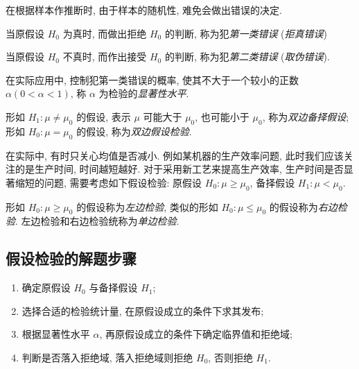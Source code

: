 在根据样本作推断时, 由于样本的随机性, 难免会做出错误的决定.

\begin{definition}[第一类错误]
    当原假设 $ H_{0} $ 为真时, 而做出拒绝 $ H_{0} $ 的判断, 称为犯\textit{第一类错误} (\textit{拒真错误})
\end{definition}

\begin{definition}[第二类错误]
    当原假设 $ H_{0} $ 不真时, 而作出接受 $ H_{0} $ 的判断, 称为犯\textit{第二类错误} (\textit{取伪错误}).
\end{definition}

\begin{definition}[显著性水平]
    在实际应用中, 控制犯第一类错误的概率, 使其不大于一个较小的正数 $ \alpha(0<\alpha<1)$, 称 $ \alpha $ 为检验的\textit{显著性水平}.
\end{definition}

\begin{definition}[双边备择假设与双边假设检验]
    形如 $ H_{1}: \mu \neq \mu_{0} $ 的假设, 表示 $ \mu $ 可能大于 $ \mu_{0} $, 也可能小于 $ \mu_{0}$, 称为\textit{双边备择假设};
    形如 $ H_{0}: \mu=\mu_{0} $ 的假设, 称为\textit{双边假设检验}.
\end{definition}

在实际中, 有时只关心均值是否减小. 例如某机器的生产效率问题, 此时我们应该关注的是生产时间, 时间越短越好.
对于采用新工艺来提高生产效率, 生产时间是否显著缩短的问题, 需要考虑如下假设检验:
原假设 $ H_{0}: \mu \geqslant \mu_{0}$, 备择假设 $ H_{1}: \mu<\mu_{0} .$

\begin{definition}[单边检验]
    形如 $ H_{0}: \mu \geqslant \mu_{0} $ 的假设称为\textit{左边检验}, 类似的形如 $ H_{0}: \mu \leqslant \mu_{0} $ 的假设称为\textit{右边检验}.
    左边检验和右边检验统称为\textit{单边检验}.
\end{definition}

\subsection{假设检验的解题步骤}

\begin{enumerate}[label=(\arabic{*})]
    \item 确定原假设 $H_0$ 与备择假设 $H_1$;
    \item 选择合适的检验统计量, 在原假设成立的条件下求其发布;
    \item 根据显著性水平 $\alpha$, 再原假设成立的条件下确定临界值和拒绝域;
    \item 判断是否落入拒绝域, 落入拒绝域则拒绝 $H_0$, 否则拒绝 $H_1$.
\end{enumerate}


